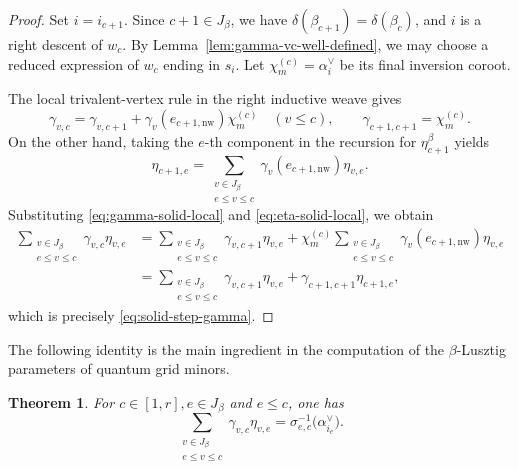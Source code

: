 \documentclass[12pt, reqno]{amsart}
\theoremstyle{plain}
\newtheorem{theorem}{Theorem}[section]
\theoremstyle{definition}
\numberwithin{equation}{section}
\begin{document}
\begin{proof}
Set \(i=i_{c+1}\). Since \(c+1\in J_\beta\), we have
\(\delta(\beta_{c+1})=\delta(\beta_c)\), and \(i\) is a right descent
of \(w_c\). By Lemma~\ref{lem:gamma-vc-well-defined}, we may choose a
reduced expression of \(w_c\) ending in \(s_i\). Let
\(\chi_m^{(c)}=\alpha_i^\vee\) be its final inversion coroot.

The local trivalent-vertex rule in the right inductive weave gives
\begin{equation}
 \gamma_{v,c}
 =
 \gamma_{v,c+1}
 +
 \gamma_v(e_{c+1,\mathrm{nw}})\chi_m^{(c)}
 \quad (v\leq c),
 \qquad
 \gamma_{c+1,c+1}=\chi_m^{(c)}.
 \label{eq:gamma-solid-local}
\end{equation}
On the other hand, taking the \(e\)-th component in the recursion for
\(\eta_{c+1}^\beta\) yields
\begin{equation}
 \eta_{c+1,e}
 =
 \sum_{\substack{v\in J_\beta\\ e\leq v\leq c}}
 \gamma_v(e_{c+1,\mathrm{nw}})\eta_{v,e}.
 \label{eq:eta-solid-local}
\end{equation}
Substituting \eqref{eq:gamma-solid-local} and
\eqref{eq:eta-solid-local}, we obtain
\begin{align*}
 \sum_{\substack{v\in J_\beta\\e\leq v\leq c}}
 \gamma_{v,c}\eta_{v,e}
 &=
 \sum_{\substack{v\in J_\beta\\e\leq v\leq c}}
 \gamma_{v,c+1}\eta_{v,e}
 +
 \chi_m^{(c)}
 \sum_{\substack{v\in J_\beta\\e\leq v\leq c}}
 \gamma_v(e_{c+1,\mathrm{nw}})\eta_{v,e}                 \\
 &=
 \sum_{\substack{v\in J_\beta\\e\leq v\leq c}}
 \gamma_{v,c+1}\eta_{v,e}
 +
 \gamma_{c+1,c+1}\eta_{c+1,e},
\end{align*}
which is precisely \eqref{eq:solid-step-gamma}.
\end{proof}

The following identity is the main ingredient in the computation of
the $\beta$-Lusztig parameters of quantum grid minors.

\begin{theorem}
\label{thm:root-identity}
For \(c\in [1,r], e\in J_\beta\) and \(e\leq c\), one has
\begin{equation}\label{eq:root-identity}
 \sum_{\substack{v\in J_\beta\\e\leq v\leq c}}
 \gamma_{v,c}\eta_{v,e}
 =
 \sigma_{e,c}^{-1}\bigl(\alpha_{i_e}^{\vee}\bigr).
\end{equation}
\end{theorem}
\end{document}
